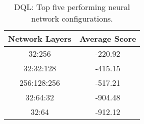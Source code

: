 \begin{table}[h]
    \centering
    \begin{tabular}{|c|c|}
    \hline
    \textbf{Network Layers} & \textbf{Average Score} \\
    \hline
    \hline
    32:256 & -220.92 \\
    \hline
    32:32:128 & -415.15 \\
    \hline
    256:128:256 & -517.21 \\
    \hline
    32:64:32 & -904.48 \\
    \hline
    32:64 & -912.12 \\
    \hline
    \end{tabular}
    \caption{DQL: Top five performing neural network configurations.}
    \label{tab:ppo_top_nn_configurations}
\end{table}
    
